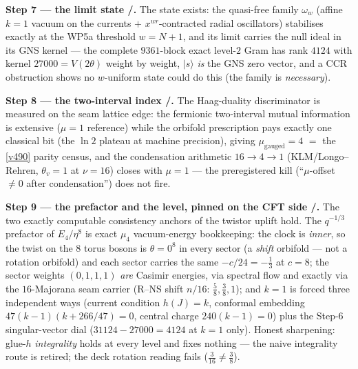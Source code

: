 \par\smallskip\noindent\textbf{Step 7 --- the limit state \mE/\mC.} The state exists: the quasi-free
family $\omega_w$ (affine $k{=}1$ vacuum on the currents $+$ $x^{wr}$-contracted radial oscillators)
stabilises exactly at the WP5a threshold $w=N{+}1$, and its limit carries the null ideal in its GNS
kernel --- the complete $9361$-block exact level-$2$ Gram has rank $4124$ with kernel
$27000=V(2\theta)$ weight by weight, $|s\rangle$ \emph{is} the GNS zero vector, and a CCR obstruction
shows no $w$-uniform state could do this (the family is \emph{necessary}).

\par\smallskip\noindent\textbf{Step 8 --- the two-interval index \mE/\mC.} The Haag-duality
discriminator is measured on the seam lattice edge: the fermionic two-interval mutual information is
extensive ($\mu{=}1$ reference) while the orbifold prescription pays exactly one classical bit (the
$\ln2$ plateau at machine precision), giving $\mu_{\mathrm{gauged}}=4$ $=$ the \vref{v490} parity
census, and the condensation arithmetic $16\to4\to1$ (KLM/Longo--Rehren, $\theta_v=1$ at $\nu=16$)
closes with $\mu=1$ --- the preregistered kill (``$\mu$-offset $\neq0$ after condensation'') does not
fire. 

\par\smallskip\noindent\textbf{Step 9 --- the prefactor and the level, pinned on the CFT side
\mE/\mC.} The two exactly computable consistency anchors of the twistor uplift hold. The $q^{-1/3}$
prefactor of $E_4/\eta^8$ is exact $\mu_4$ vacuum-energy bookkeeping: the clock is \emph{inner}, so
the twist on the $8$ torus bosons is $\theta=0^8$ in every sector (a \emph{shift} orbifold --- not a
rotation orbifold) and each sector carries the same $-c/24=-\tfrac13$ at $c=8$; the sector weights
$(0,1,1,1)$ \emph{are} Casimir energies, via spectral flow and exactly via the $16$-Majorana seam
carrier (R--NS shift $n/16$: $\tfrac58,\tfrac38,1$); and $k=1$ is forced three independent ways
(current condition $h(J)=k$, conformal embedding $47(k{-}1)(k{+}266/47)=0$, central charge
$240(k{-}1)=0$) plus the Step-6 singular-vector dial ($31124-27000=4124$ at $k=1$ only). Honest
sharpening: glue-$h$ \emph{integrality} holds at every level and fixes nothing --- the naive
integrality route is retired; the deck rotation reading fails ($\tfrac3{16}\neq\tfrac38$).

